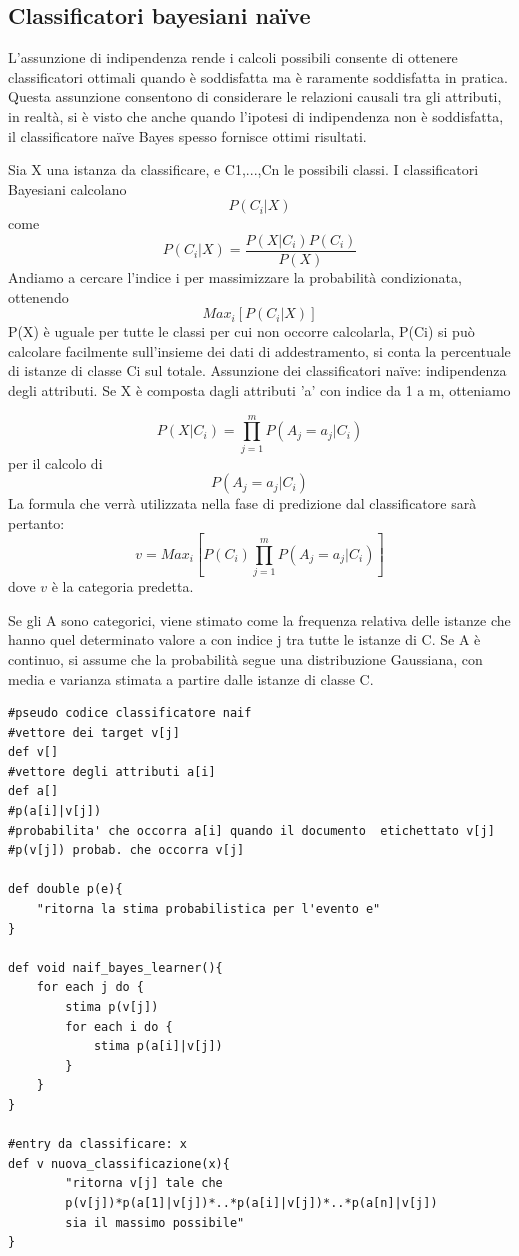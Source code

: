 \documentclass{article}
\theoremstyle{plain}
\theoremstyle{definition}
\begin{document}
\subsection{Classificatori bayesiani naïve}
L'assunzione di indipendenza rende i calcoli possibili consente di ottenere classificatori ottimali quando è soddisfatta ma è raramente soddisfatta in pratica.
Questa assunzione consentono di considerare le relazioni causali tra gli attributi, in realtà, si è visto che anche quando l’ipotesi di indipendenza non è soddisfatta, il classificatore naïve Bayes spesso fornisce ottimi risultati.

Sia X una istanza da classificare, e C1,...,Cn le possibili classi. I classificatori Bayesiani calcolano $$P(C_i|X)$$ come $$P(C_i|X)=\frac{P(X|C_i)P(C_i)}{P(X)}$$
Andiamo a cercare l'indice i per massimizzare la probabilità condizionata, ottenendo $$Max_i [P(C_i|X)]$$
P(X) è uguale per tutte le classi per cui non occorre calcolarla, P(Ci) si può calcolare facilmente sull’insieme dei dati di addestramento, si conta la percentuale di istanze di classe Ci sul totale.
Assunzione dei classificatori naïve: indipendenza degli
attributi.
Se X è composta dagli attributi 'a' con indice da 1 a m, otteniamo

$$P(X|C_i)=\prod_{j=1}^m P(A_j=a_j|C_i)$$
per il calcolo di 
$$P(A_j=a_j|C_i)$$
La formula che verrà utilizzata nella fase di predizione dal classificatore sarà pertanto:
$$v=Max_i [P(C_i)\prod_{j=1}^m P(A_j=a_j|C_i)]$$
dove $v$ è la categoria predetta.

Se gli A sono categorici, viene stimato come la frequenza relativa delle istanze che hanno quel determinato valore a con indice j tra tutte le istanze di C.
Se A è continuo, si assume che la probabilità segue una distribuzione Gaussiana, con media e varianza stimata a partire dalle istanze di classe C.

\begin{lstlisting}
#pseudo codice classificatore naif
#vettore dei target v[j]
def v[]
#vettore degli attributi a[i]
def a[]
#p(a[i]|v[j]) 
#probabilita' che occorra a[i] quando il documento  etichettato v[j]
#p(v[j]) probab. che occorra v[j]

def double p(e){
	"ritorna la stima probabilistica per l'evento e"
}

def void naif_bayes_learner(){
	for each j do {
		stima p(v[j])
		for each i do {
			stima p(a[i]|v[j])
		}
	}
}

#entry da classificare: x
def v nuova_classificazione(x){
		"ritorna v[j] tale che
		p(v[j])*p(a[1]|v[j])*..*p(a[i]|v[j])*..*p(a[n]|v[j])
		sia il massimo possibile"
}
\end{lstlisting}
\end{document}

